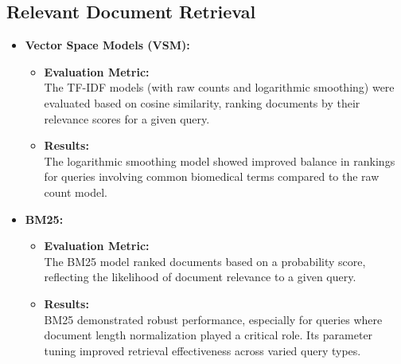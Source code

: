 \documentclass{article}
\begin{document}
\subsection{Relevant Document Retrieval}
\begin{itemize}
    \item \textbf{Vector Space Models (VSM):}
    \begin{itemize}
        \item \textbf{Evaluation Metric:}\\
        The TF-IDF models (with raw counts and logarithmic smoothing) were evaluated based on cosine similarity, ranking documents by their relevance scores for a given query.
        \item \textbf{Results:}\\
        The logarithmic smoothing model showed improved balance in rankings for queries involving common biomedical terms compared to the raw count model.
    \end{itemize}
    \item \textbf{BM25:}
    \begin{itemize}
        \item \textbf{Evaluation Metric:}\\
        The BM25 model ranked documents based on a probability score, reflecting the likelihood of document relevance to a given query.
        \item \textbf{Results:}\\
        BM25 demonstrated robust performance, especially for queries where document length normalization played a critical role. Its parameter tuning improved retrieval effectiveness across varied query types.
    \end{itemize}
\end{itemize}
\end{document}
